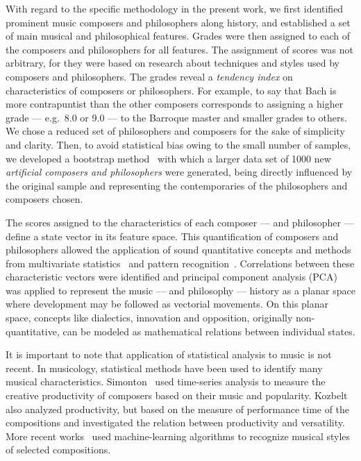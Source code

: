 \documentclass[
 aip,
 jmp,
 amsmath,amssymb,
 reprint,
]{revtex4-1}
\begin{document}
With regard to the specific methodology in the present work, we first
identified prominent music composers and philosophers along history,
and established a set of main musical and philosophical
features. Grades were then assigned to each of the composers and
philosophers for all features. The assignment of scores was not
arbitrary, for they were based on research about techniques and styles
used by composers and philosophers. The grades reveal a \emph{tendency
  index} on characteristics of composers or philosophers. For example,
to say that Bach is more contrapuntist than the other composers
corresponds to assigning a higher grade --- e.g.\ 8.0 or 9.0 --- to
the Barroque master and smaller grades to others. We chose a reduced
set of philosophers and composers for the sake of simplicity and
clarity. Then, to avoid statistical bias owing to the small number of
samples, we developed a bootstrap method~\cite{Varian} with which a
larger data set of 1000 new \emph{artificial composers and
  philosophers} were generated, being directly influenced by the
original sample and representing the contemporaries of the
philosophers and composers chosen.

The scores assigned to the characteristics of each composer --- and
philosopher --- define a state vector in its feature space. This
quantification of composers and philosophers allowed the application
of sound quantitative concepts and methods from multivariate
statistics~\cite{Papoulis, Wichern, Therrien} and pattern
recognition~\cite{Duda, Costa}. Correlations between these
characteristic vectors were identified and principal component
analysis (PCA)~\cite{Costa} was applied to represent the music --- and
philosophy --- history as a planar space where development may be
followed as vectorial movements. On this planar space, concepts like
dialectics, innovation and opposition, originally non-quantitative,
can be modeled as mathematical relations between individual states.

It is important to note that application of statistical analysis to
music is not recent. In musicology, statistical methods have been used
to identify many musical
characteristics. Simonton~\cite{Simonton1991829, Simonton1977791} used
time-series analysis to measure the creative productivity of composers
based on their music and popularity. Kozbelt~\cite{Kozbelt01012009,
  Kozbelt01012007} also analyzed productivity, but based on the
measure of performance time of the compositions and investigated the
relation between productivity and versatility. More recent
works~\cite{Kranenburg2004, Kranenburg2007} used machine-learning
algorithms to recognize musical styles of selected compositions.
\end{document}
